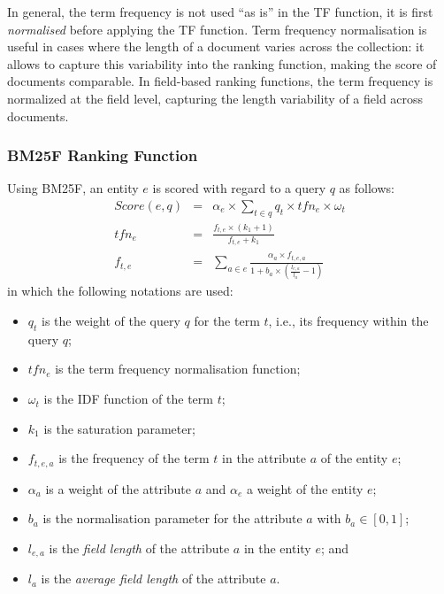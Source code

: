 In general, the term frequency is not used ``as is'' in the TF function, it is first \emph{normalised} before applying the TF function. Term frequency normalisation is useful in cases where the length of a document varies across the collection: it allows to capture this variability into the ranking function, making the score of documents comparable. In field-based ranking functions, the term frequency is normalized at the field level, capturing the length variability of a field across documents.

\subsubsection{BM25F Ranking Function}

Using BM25F, an entity $e$ is scored with regard to a query $q$ as follows:
\begin{eqnarray}
Score(e,q) & = & \alpha_e\times\sum_{t\in q}{q_t\times tfn_e \times \omega_t}\\
\label{eq:tfidf-score}
tfn_e & = & \frac{f_{t,e}\times(k_1+1)}{f_{t,e}+k_1} \\
\label{eq:bm25f_2}
f_{t,e} & = &
\sum_{a\in e}{\frac{\alpha_a\times f_{t,e,a}}{1+b_a\times\left(\frac{l_{e,a}}{l_a}-1\right)}}
\label{eq:bm25f_1}
\end{eqnarray}
in which the following notations are used:
\begin{itemize}
	\item $q_t$ is the weight of the query $q$ for the term $t$, i.e., its frequency within the query $q$;
	\item $tfn_e$ is the term frequency normalisation function;
	\item $\omega_t$ is the IDF function of the term $t$;
	\item $k_1$ is the saturation parameter;
	\item $f_{t,e,a}$ is the frequency of the term $t$ in the attribute $a$ of the entity $e$;
	\item $\alpha_a$ is a weight of the attribute $a$ and $\alpha_e$ a weight of the entity $e$;
	\item $b_a$ is the normalisation parameter for the attribute $a$ with $b_a \in \left[0,1\right]$;
	\item $l_{e,a}$ is the \emph{field length} of the attribute $a$ in the entity $e$; and
	\item $l_a$ is the \emph{average field length} of the attribute $a$.
\end{itemize}

